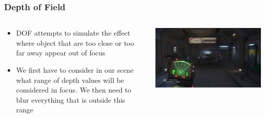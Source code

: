 \begin{frame}
	\frametitle{Depth of Field}
\begin{columns}
	\begin{column}{0.5\textwidth}
		\begin{itemize}
			\item DOF attempts to simulate the effect where object that are too close or too far away appear out of focus
			\item We first have to consider in our scene what range of depth values will be considered in focus. We then need to blur everything that is outside this range
		\end{itemize}
	\end{column}
	\begin{column}{0.5\textwidth} 
		\begin{center}
			\includegraphics[width=\textwidth]{depth_of_field}
		\end{center}
	\end{column}
\end{columns}	
\end{frame}

